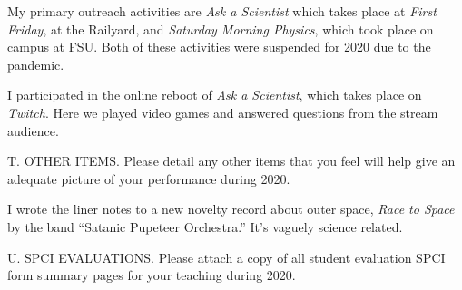My primary outreach activities are \emph{Ask a Scientist} which takes place at
\emph{First Friday}, at the Railyard, and \emph{Saturday Morning Physics}, which
took place on campus at FSU.  Both of these activities were suspended for 2020
due to the pandemic.  

I participated in the online reboot of \emph{Ask a Scientist}, which takes place
on \emph{Twitch}.  Here we played video games and answered questions from the
stream audience.

\noindent T. OTHER ITEMS. Please detail any other items that you
feel will help give an adequate picture of your performance during
2020.
\bigskip

I wrote the liner notes to a new novelty record about outer space, \emph{Race to
Space} by the band ``Satanic Pupeteer Orchestra.''  It's vaguely science
related.

\noindent U.  SPCI EVALUATIONS. Please attach a copy of all student
evaluation SPCI form summary pages for your teaching during 2020.






